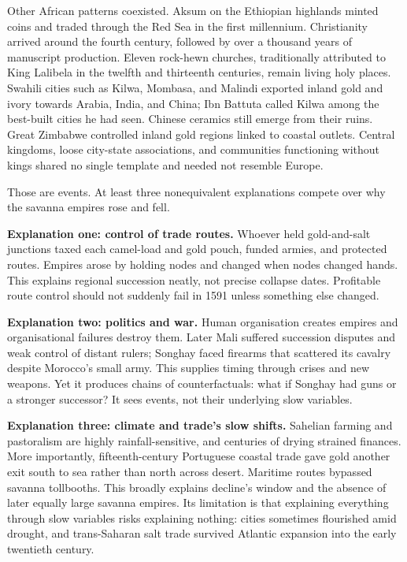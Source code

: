 Other African patterns coexisted. Aksum on the Ethiopian highlands minted coins and traded through the Red Sea in the first millennium. Christianity arrived around the fourth century, followed by over a thousand years of manuscript production. Eleven rock-hewn churches, traditionally attributed to King Lalibela in the twelfth and thirteenth centuries, remain living holy places. Swahili cities such as Kilwa, Mombasa, and Malindi exported inland gold and ivory towards Arabia, India, and China; Ibn Battuta called Kilwa among the best-built cities he had seen. Chinese ceramics still emerge from their ruins. Great Zimbabwe controlled inland gold regions linked to coastal outlets. Central kingdoms, loose city-state associations, and communities functioning without kings shared no single template and needed not resemble Europe.

Those are events. At least three nonequivalent explanations compete over why the savanna empires rose and fell.

\textbf{Explanation one: control of trade routes.} Whoever held gold-and-salt junctions taxed each camel-load and gold pouch, funded armies, and protected routes. Empires arose by holding nodes and changed when nodes changed hands. This explains regional succession neatly, not precise collapse dates. Profitable route control should not suddenly fail in 1591 unless something else changed.

\textbf{Explanation two: politics and war.} Human organisation creates empires and organisational failures destroy them. Later Mali suffered succession disputes and weak control of distant rulers; Songhay faced firearms that scattered its cavalry despite Morocco's small army. This supplies timing through crises and new weapons. Yet it produces chains of counterfactuals: what if Songhay had guns or a stronger successor? It sees events, not their underlying slow variables.

\textbf{Explanation three: climate and trade's slow shifts.} Sahelian farming and pastoralism are highly rainfall-sensitive, and centuries of drying strained finances. More importantly, fifteenth-century Portuguese coastal trade gave gold another exit south to sea rather than north across desert. Maritime routes bypassed savanna tollbooths. This broadly explains decline's window and the absence of later equally large savanna empires. Its limitation is that explaining everything through slow variables risks explaining nothing: cities sometimes flourished amid drought, and trans-Saharan salt trade survived Atlantic expansion into the early twentieth century.

